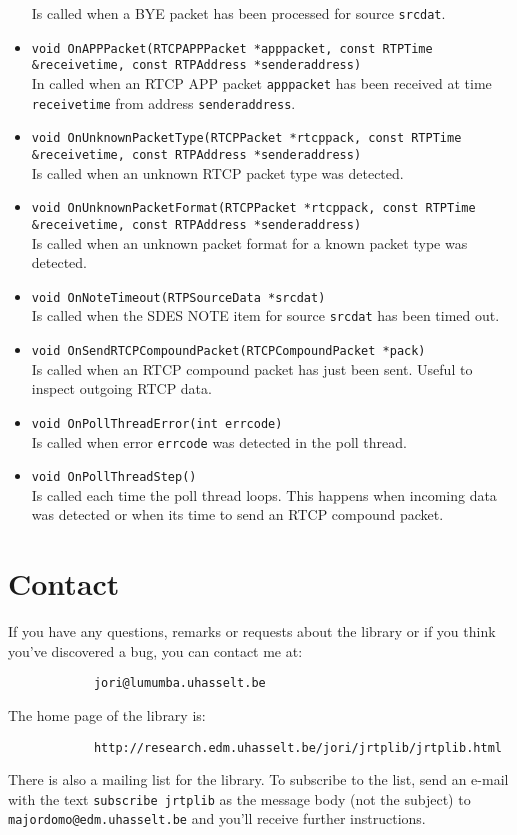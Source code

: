 \documentclass[12pt,a4paper]{article}
\begin{document}
\begin{itemize}
						Is called when a BYE packet has been processed for source
						{\tt srcdat}.
					\item {\tt void OnAPPPacket(RTCPAPPPacket *apppacket, const RTPTime \&receivetime,
					                                    const RTPAddress *senderaddress)}\\
						In called when an RTCP APP packet {\tt apppacket} has been received 
						at time {\tt receivetime} from address {\tt senderaddress}.
					\item {\tt void OnUnknownPacketType(RTCPPacket *rtcppack, const RTPTime \&receivetime,
					                                            const RTPAddress *senderaddress)}\\
						Is called when an unknown RTCP packet type was detected.
					\item {\tt void OnUnknownPacketFormat(RTCPPacket *rtcppack, const RTPTime \&receivetime,
					                                              const RTPAddress *senderaddress)}\\
						Is called when an unknown packet format for a known packet
						type was detected.
					\item {\tt void OnNoteTimeout(RTPSourceData *srcdat)}\\
						Is called when the SDES NOTE item for source {\tt srcdat}
						has been timed out.
					\item {\tt void OnSendRTCPCompoundPacket(RTCPCompoundPacket *pack)}\\
						Is called when an RTCP compound packet has just been sent. Useful
						to inspect outgoing RTCP data.
					\item {\tt void OnPollThreadError(int errcode)}\\
						Is called when error {\tt errcode} was detected in the
						poll thread.
					\item {\tt void OnPollThreadStep()}\\
						Is called each time the poll thread loops. This happens when
						incoming data was detected or when its time to send an RTCP
						compound packet.
				\end{itemize}

	\section{Contact}
		
		If you have any questions, remarks or requests about the library or
		if you think you've discovered a bug, you can contact me at:
		\begin{verbatim}
			jori@lumumba.uhasselt.be
		\end{verbatim}
		
		The home page of the library is:
		\begin{verbatim}
			http://research.edm.uhasselt.be/jori/jrtplib/jrtplib.html
		\end{verbatim}

		There is also a mailing list for the library. To subscribe to the list, 
		send an e-mail with the text {\tt subscribe jrtplib} as the message body (not 
		the subject) to {\tt majordomo@edm.uhasselt.be} and you'll receive further 
		instructions.
\end{document}
